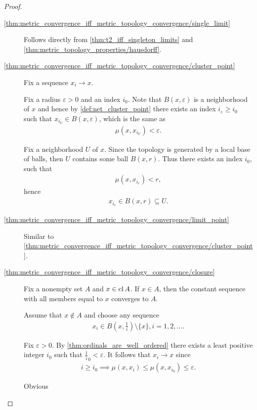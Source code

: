 \begin{proof}
  \begin{description}
    \item[\ref{thm:metric_convergence_iff_metric_topology_convergence/single_limit}] Follows directly from \cref{thm:t2_iff_singleton_limits} and \cref{thm:metric_topology_properties/hausdorff}.

    \item[\ref{thm:metric_convergence_iff_metric_topology_convergence/cluster_point}] Fix a sequence \( x_i \to x \).

    \Implies Fix a radius \( \varepsilon > 0 \) and an index \( i_0 \). Note that \( B(x, \varepsilon) \) is a neighborhood of \( x \) and hence by \cref{def:net_cluster_point} there exists an index \( i_\varepsilon \geq i_0 \) such that \( x_{i_U} \in B(x, \varepsilon) \), which is the same as
    \begin{align*}
      \mu(x, x_{i_U}) < \varepsilon.
    \end{align*}

    \ImpliedBy Fix a neighborhood \( U \) of \( x \). Since the topology is generated by a local base of balls, then \( U \) contains some ball \( B(x, r) \). Thus there exists an index \( i_0 \), such that
    \begin{align*}
      \mu(x, x_{i_r}) < r,
    \end{align*}
    hence
    \begin{align*}
      x_{i_r} \in B(x, r) \subseteq U.
    \end{align*}

    \item[\ref{thm:metric_convergence_iff_metric_topology_convergence/limit_point}] Similar to \ref{thm:metric_convergence_iff_metric_topology_convergence/cluster_point}.

    \item[\ref{thm:metric_convergence_iff_metric_topology_convergence/closure}]
    \Implies Fix a nonempty set \( A \) and \( x \in \operatorname{cl} A \). If \( x \in A \), then the constant sequence with all members equal to \( x \) converges to \( A \).

    Assume that \( x \not\in A \) and choose any sequence\AOC
    \begin{align*}
      x_i \in B(x, \tfrac 1 i) \setminus \{ x \}, i = 1, 2, \ldots.
    \end{align*}

    Fix \( \varepsilon > 0 \). By \cref{thm:ordinals_are_well_ordered} there exists a least positive integer \( i_0 \) such that \( \tfrac 1 i_0 < \varepsilon \). It follows that \( x_i \to x \) since
    \begin{align*}
      i \geq i_0 \implies \mu(x, x_i) \leq \mu(x, x_{i_0}) \leq \varepsilon.
    \end{align*}

    \ImpliedBy Obvious
  \end{description}
\end{proof}

